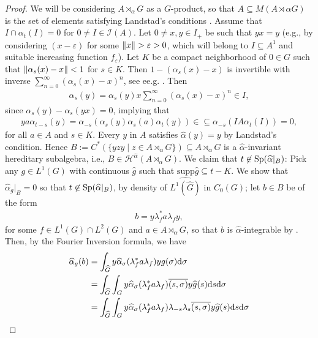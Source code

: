 \begin{proof}
	We will be considering $A \rtimes_\alpha G$ as a $G$-product, so that $A \subseteq M(A \rtimes\alpha G)$ is the set of elements satisfying Landstad's conditions . Assume that $I \cap \alpha_t(I) = 0$ for $0 \neq I \in \mathcal{I}(A)$.  Let $0 \neq x,y \in I_+$ be such that $yx=y$ (e.g., by considering $(x-\varepsilon)$ for some $ \left\lVert x \right\rVert >\varepsilon > 0$, which will belong to $I \subseteq A^1$ and suitable increasing function $f_\varepsilon$). Let $K$ be a compact neighborhood of $0 \in G$ such that $ \left\lVert \alpha_s(x)-x	\right\rVert < 1$ for $s \in K$. Then $1-(\alpha_s(x)-x)$ is invertible with inverse $\sum_{n=0}^\infty (\alpha_s(x)-x)^n$, see ee.g. \cite[Proposition 2.1]{zhu}. Then
	\begin{align*}
		\alpha_s(y)=\alpha_s(y)x \sum_{n=0}^\infty (\alpha_s(x)-x)^n \in I,
	\end{align*}
	since $\alpha_s(y)-\alpha_s(yx)=0$, implying that 
	\begin{align*}
	y a \alpha_{t-s}(y) = \alpha_{-s}(\alpha_s(y)\alpha_s(a)\alpha_t(y)) \in \subseteq \alpha_{-s}(I A \alpha_t(I)) = 0,
	\end{align*}
	for all $a \in A$ and $s \in K$. Every $y$ in $A$ satisfies $\hat\alpha(y) = y$ by Landstad's condition. Hence $B:= C^*(\{y z y \mid z \in A \rtimes_\alpha G\}) \subseteq A \rtimes_\alpha G$ is a $\hat \alpha$-invariant hereditary subalgebra, i.e., $B \in \mathscr{H}^{\hat \alpha}(A \rtimes_\alpha G)$. We claim that $t \not \in \mathrm{Sp}(\widehat{\alpha} |_B)$: Pick any $g \in L^1(G)$ with continuous $\hat g$ such that $\mathrm{supp} \hat g \subseteq t-K$. We show that $\hat \alpha_g |_B = 0$ so that $t \not\in \mathrm{Sp}(\widehat{\alpha}|_B)$, by density of $\hat {L^1(\hat G)}$ in $C_0(G)$; let $b \in B$ be of the form
	\begin{align*}
		b = y \lambda_f^* a \lambda_f y,
	\end{align*}
	for some $f \in L^1(G) \cap L^2(G)$ and $ a \in A \rtimes_\alpha G$, so that $b$ is $\hat \alpha$-integrable by . Then, by the Fourier Inversion formula, we have 
	\begin{align*}
		\hat \alpha_g(b) &= \int_{\hat G} y \hat \alpha_\sigma(\lambda_f^* a \lambda_f) y g(\sigma) \d \sigma \\
		&= \int_{\hat G} \int_G y \hat \alpha_\sigma(\lambda_f^* a \lambda_f) \overline{(s,\sigma)} y \hat g(s) \d s \d \sigma\\
		&= \int_{\hat G} \int_G y \hat \alpha_\sigma(\lambda_f^* a \lambda_f) \lambda_{-s} \lambda_s \overline{(s,\sigma)} y \hat g(s) \d s \d \sigma\\

\end{align*}
\end{proof}
